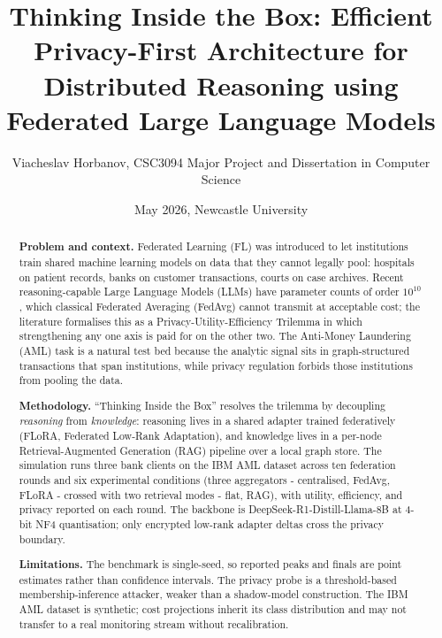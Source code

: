 \documentclass{report}
\title{Thinking Inside the Box: Efficient Privacy-First Architecture for Distributed Reasoning using Federated Large Language Models}
\author{Viacheslav Horbanov, CSC3094 Major Project and Dissertation in Computer Science}
\date{May 2026, Newcastle University}
\begin{document}



\maketitle

\begin{abstract}
\textbf{Problem and context.} Federated Learning (FL) was introduced to let institutions train shared machine learning models on data that they cannot legally pool: hospitals on patient records, banks on customer transactions, courts on case archives. Recent reasoning-capable Large Language Models (LLMs) have parameter counts of order $10^{10}$, which classical Federated Averaging (FedAvg) cannot transmit at acceptable cost; the literature formalises this as a Privacy-Utility-Efficiency Trilemma in which strengthening any one axis is paid for on the other two. The Anti-Money Laundering (AML) task is a natural test bed because the analytic signal sits in graph-structured transactions that span institutions, while privacy regulation forbids those institutions from pooling the data.

\textbf{Methodology.} ``Thinking Inside the Box'' resolves the trilemma by decoupling \textit{reasoning} from \textit{knowledge}: reasoning lives in a shared adapter trained federatively (FLoRA, Federated Low-Rank Adaptation), and knowledge lives in a per-node Retrieval-Augmented Generation (RAG) pipeline over a local graph store. The simulation runs three bank clients on the IBM AML dataset across ten federation rounds and six experimental conditions (three aggregators - centralised, FedAvg, FLoRA - crossed with two retrieval modes - flat, RAG), with utility, efficiency, and privacy reported on each round. The backbone is DeepSeek-R1-Distill-Llama-8B at 4-bit NF4 quantisation; only encrypted low-rank adapter deltas cross the privacy boundary.

\textbf{Limitations.} The benchmark is single-seed, so reported peaks and finals are point estimates rather than confidence intervals. The privacy probe is a threshold-based membership-inference attacker, weaker than a shadow-model construction. The IBM AML dataset is synthetic; cost projections inherit its class distribution and may not transfer to a real monitoring stream without recalibration.


\end{abstract}
\end{document}
